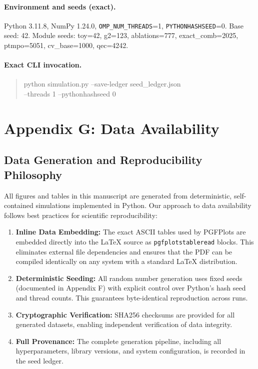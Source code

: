\documentclass[a4paper,11pt]{article}
\theoremstyle{plain}
\theoremstyle{definition}
\theoremstyle{remark}
\begin{document}
\paragraph{Environment and seeds (exact).}
Python 3.11.8, NumPy 1.24.0, \texttt{OMP\_NUM\_THREADS}=1, \texttt{PYTHONHASHSEED}=0.
Base seed: 42. Module seeds: toy=42, g2=123, ablations=777, exact\_comb=2025, ptmpo=5051, cv\_base=1000, qec=4242.
\paragraph{Exact CLI invocation.}
\begin{quote}\small\ttfamily
python simulation.py --save-ledger seed\_ledger.json\\
\quad --threads 1 --pythonhashseed 0
\end{quote}

\section{Appendix G: Data Availability}
\label{app:data}

\subsection{Data Generation and Reproducibility Philosophy}
All figures and tables in this manuscript are generated from deterministic, self-contained simulations implemented in Python. Our approach to data availability follows best practices for scientific reproducibility:

\begin{enumerate}[leftmargin=*]
\item \textbf{Inline Data Embedding:} The exact ASCII tables used by PGFPlots are embedded directly into the \LaTeX{} source as \texttt{pgfplotstableread} blocks. This eliminates external file dependencies and ensures that the PDF can be compiled identically on any system with a standard \LaTeX{} distribution.

\item \textbf{Deterministic Seeding:} All random number generation uses fixed seeds (documented in Appendix F) with explicit control over Python's hash seed and thread counts. This guarantees byte-identical reproduction across runs.

\item \textbf{Cryptographic Verification:} SHA256 checksums are provided for all generated datasets, enabling independent verification of data integrity.

\item \textbf{Full Provenance:} The complete generation pipeline, including all hyperparameters, library versions, and system configuration, is recorded in the seed ledger.
\end{enumerate}
\end{document}
